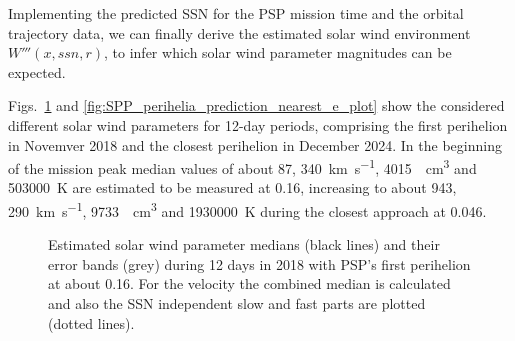 Implementing the predicted SSN for the PSP mission time and the orbital trajectory data, we can finally derive the estimated solar wind environment $W'''(x,ssn,r)$, to infer which solar wind parameter magnitudes can be expected.

Figs.~\ref{fig:SPP_perihelia_prediction_e_plot} and \ref{fig:SPP_perihelia_prediction_nearest_e_plot} show the considered different solar wind parameters for 12-day periods, comprising the first perihelion in Novemver 2018 and the closest perihelion in December 2024. In the beginning of the mission peak median values of about \SI{87}{\nT}, \SI{340}{\km\per\s}, \SI{4015}{\per\cm\cubed} and \SI{503000}{\K} are estimated to be measured at \SI{0.16}{\au}, increasing to about \SI{943}{\nT}, \SI{290}{\km\per\s}, \SI{9733}{\per\cm\cubed} and \SI{1930000}{\K} during the closest approach at \SI{0.046}{\au}.
\begin{figure}
	\caption{Estimated solar wind parameter medians (black lines) and their error bands (grey) during 12 days in 2018 with PSP's first perihelion at about \SI{0.16}{\au}. For the velocity the combined median is calculated and also the SSN independent slow and fast parts are plotted (dotted lines).}
	\label{fig:SPP_perihelia_prediction_e_plot}
\end{figure}
